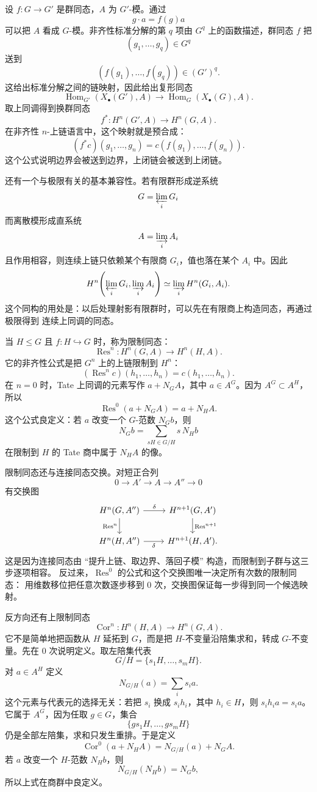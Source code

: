 \documentclass[11pt,a4paper,openany]{ctexbook}
\numberwithin{equation}{chapter}
\theoremstyle{plain}
\theoremstyle{definition}
\theoremstyle{remark}
\begin{document}
设 $f:G\to G'$ 是群同态，$A$ 为 $G'$-模。通过
\[
g\cdot a=f(g)a
\]
可以把 $A$ 看成 $G$-模。非齐性标准分解的第 $q$ 项由 $G^q$ 上的函数描述，群同态 $f$
把
\[
(g_1,\ldots,g_q)\in G^q
\]
送到
\[
(f(g_1),\ldots,f(g_q))\in (G')^q.
\]
这给出标准分解之间的链映射，因此给出复形同态
\[
\operatorname{Hom}_{G'}(X_\bullet(G'),A)\to
\operatorname{Hom}_{G}(X_\bullet(G),A).
\]
取上同调得到换群同态
\[
f^\ast:H^n(G',A)\to H^n(G,A).
\]
在非齐性 $n$-上链语言中，这个映射就是预合成：
\[
(f^\ast c)(g_1,\ldots,g_n)=c(f(g_1),\ldots,f(g_n)).
\]
这个公式说明边界会被送到边界，上闭链会被送到上闭链。

还有一个与极限有关的基本兼容性。若有限群形成逆系统
\[
G=\varprojlim_i G_i
\]
而离散模形成直系统
\[
A=\varinjlim_i A_i
\]
且作用相容，则连续上链只依赖某个有限商 $G_i$，值也落在某个 $A_i$ 中。因此
\[
H^n\!\left(\varprojlim_iG_i,\varinjlim_iA_i\right)
\simeq
\varinjlim_i H^n(G_i,A_i).
\]
这个同构的用处是：以后处理射影有限群时，可以先在有限商上构造同态，再通过极限得到
连续上同调的同态。

当 $H\le G$ 且 $f:H\hookrightarrow G$ 时，称为限制同态：
\[
\operatorname{Res}^n:H^n(G,A)\to H^n(H,A).
\]
它的非齐性公式是把 $G^n$ 上的上链限制到 $H^n$：
\[
(\operatorname{Res}^n c)(h_1,\ldots,h_n)=c(h_1,\ldots,h_n).
\]
在 $n=0$ 时，Tate 上同调的元素写作 $a+N_GA$，其中 $a\in A^G$。因为
$A^G\subset A^H$，所以
\[
\operatorname{Res}^0(a+N_GA)=a+N_HA.
\]
这个公式良定义：若 $a$ 改变一个 $G$-范数 $N_Gb$，则
\[
N_Gb=\sum_{sH\in G/H}s\,N_Hb
\]
在限制到 $H$ 的 Tate 商中属于 $N_HA$ 的像。

限制同态还与连接同态交换。对短正合列
\[
0\to A'\to A\to A''\to0
\]
有交换图
\[
\begin{tikzcd}
H^n(G,A'')\arrow[r,"\delta"]\arrow[d,"\operatorname{Res}^n"']&
H^{n+1}(G,A')\arrow[d,"\operatorname{Res}^{n+1}"]\\
H^n(H,A'')\arrow[r,"\delta"']&
H^{n+1}(H,A').
\end{tikzcd}
\]
这是因为连接同态由 ``提升上链、取边界、落回子模'' 构造，而限制到子群与这三步逐项相容。
反过来，$\operatorname{Res}^0$ 的公式和这个交换图唯一决定所有次数的限制同态：
用维数移位把任意次数逐步移到 $0$ 次，交换图保证每一步得到同一个候选映射。

反方向还有上限制同态
\[
\operatorname{Cor}^n:H^n(H,A)\to H^n(G,A).
\]
它不是简单地把函数从 $H$ 延拓到 $G$，而是把 $H$-不变量沿陪集求和，转成
$G$-不变量。先在 $0$ 次说明定义。取左陪集代表
\[
G/H=\{s_1H,\ldots,s_mH\}.
\]
对 $a\in A^H$ 定义
\[
N_{G/H}(a)=\sum_i s_ia.
\]
这个元素与代表元的选择无关：若把 $s_i$ 换成 $s_ih_i$，其中 $h_i\in H$，则
$s_ih_ia=s_ia$。它属于 $A^G$，因为任取 $g\in G$，集合
\[
\{gs_1H,\ldots,gs_mH\}
\]
仍是全部左陪集，求和只发生重排。于是定义
\[
\operatorname{Cor}^0(a+N_HA)=N_{G/H}(a)+N_GA.
\]
若 $a$ 改变一个 $H$-范数 $N_Hb$，则
\[
N_{G/H}(N_Hb)=N_Gb,
\]
所以上式在商群中良定义。
\end{document}
